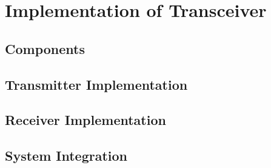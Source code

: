 \chapter{Implementation of Transceiver}
\vspace{-1.4em}



\section{Components}




\section{Transmitter Implementation}




\section{Receiver Implementation}





\section{System Integration}
